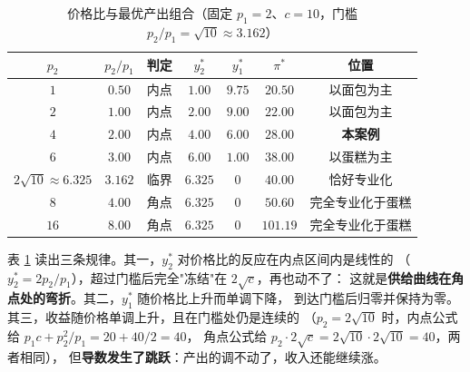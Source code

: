 \begin{table}[H]
\centering
\caption{价格比与最优产出组合（固定 $p_1=2$、$c=10$，门槛 $p_2/p_1=\sqrt{10}\approx 3.162$）}
\label{tab:corner}
\begin{tabular}{ccccccc}
\toprule
$p_2$ & $p_2/p_1$ & 判定 & $y_2^{*}$ & $y_1^{*}$ & $\pi^{*}$ & 位置 \\
\midrule
$1$      & $0.50$  & 内点 & $1.00$   & $9.75$   & $20.50$  & 以面包为主 \\
$2$      & $1.00$  & 内点 & $2.00$   & $9.00$   & $22.00$  & 以面包为主 \\
$4$      & $2.00$  & 内点 & $\mathbf{4.00}$ & $\mathbf{6.00}$ & $\mathbf{28.00}$ & \textbf{本案例}\\
$6$      & $3.00$  & 内点 & $6.00$   & $1.00$   & $38.00$  & 以蛋糕为主 \\
$2\sqrt{10}\approx 6.325$ & $3.162$ & 临界 & $6.325$  & $0$      & $40.00$  & 恰好专业化 \\
$8$      & $4.00$  & 角点 & $6.325$  & $0$      & $50.60$  & 完全专业化于蛋糕 \\
$16$     & $8.00$  & 角点 & $6.325$  & $0$      & $101.19$ & 完全专业化于蛋糕 \\
\bottomrule
\end{tabular}
\end{table}

表 \ref{tab:corner} 读出三条规律。其一，$y_2^{*}$ 对价格比的反应在内点区间内是线性的
（$y_2^{*}=2p_2/p_1$），超过门槛后完全"冻结"在 $2\sqrt{c}$，再也动不了：
这就是\textbf{供给曲线在角点处的弯折}。其二，$y_1^{*}$ 随价格比上升而单调下降，
到达门槛后归零并保持为零。其三，收益随价格单调上升，且在门槛处仍是连续的
（$p_2=2\sqrt{10}$ 时，内点公式给 $p_1c+p_2^{2}/p_1=20+40/2=40$，
角点公式给 $p_2\cdot 2\sqrt{c}=2\sqrt{10}\cdot 2\sqrt{10}=40$，两者相同），
但\textbf{导数发生了跳跃}：产出的调不动了，收入还能继续涨。

